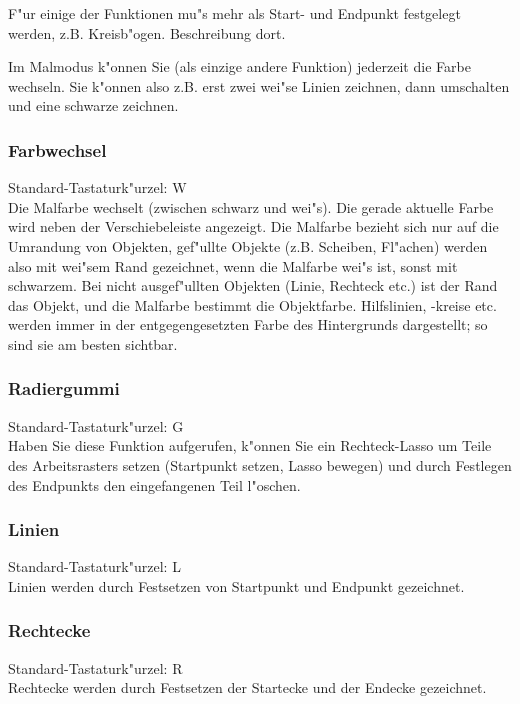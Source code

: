 F"ur einige der Funktionen mu"s mehr als Start- und Endpunkt
festgelegt werden, z.B. Kreisb"ogen. Beschreibung dort.

Im Malmodus k"onnen Sie (als einzige andere Funktion) jederzeit die 
Farbe wechseln. Sie k"onnen also z.B. erst zwei wei"se Linien 
zeichnen, dann umschalten und eine schwarze zeichnen.

\subsubsection{Farbwechsel}
Standard-Tastaturk"urzel: W \\
  
Die Malfarbe wechselt (zwischen schwarz und wei"s). Die gerade 
aktuelle Farbe wird neben der Verschiebeleiste angezeigt. Die 
Malfarbe bezieht sich nur auf die Umrandung von Objekten, 
gef"ullte Objekte (z.B. Scheiben, Fl"achen) werden also mit wei"sem 
Rand gezeichnet, wenn die Malfarbe wei"s ist, sonst mit schwarzem.
Bei nicht ausgef"ullten Objekten (Linie, Rechteck etc.) ist der 
Rand das Objekt, und die Malfarbe bestimmt die Objektfarbe. 
Hilfslinien, -kreise etc. werden immer in der entgegengesetzten 
Farbe des Hintergrunds dargestellt; so sind sie am besten 
sichtbar.

\subsubsection{Radiergummi}
Standard-Tastaturk"urzel: G \\
 
Haben Sie diese Funktion aufgerufen, k"onnen Sie ein 
Rechteck-Lasso um Teile des Arbeitsrasters setzen (Startpunkt 
setzen, Lasso bewegen) und durch Festlegen des Endpunkts den 
eingefangenen Teil l"oschen.

\subsubsection{Linien}
Standard-Tastaturk"urzel: L \\ 
Linien werden durch Festsetzen von Startpunkt und Endpunkt 
gezeichnet.

\subsubsection{Rechtecke}
Standard-Tastaturk"urzel: R \\ 
Rechtecke werden durch Festsetzen der Startecke und der
Endecke gezeichnet.


